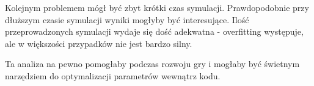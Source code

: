 \documentclass{article}
\begin{document}
Kolejnym problemem mógł być zbyt krótki czas symulacji. Prawdopodobnie przy dłuższym czasie symulacji wyniki mogłyby być interesujące. Ilość przeprowadzonych symulacji wydaje się dość adekwatna - overfitting występuje, ale w większości przypadków nie jest bardzo silny.

Ta analiza na pewno pomogłaby podczas rozwoju gry i mogłaby być świetnym narzędziem do optymalizacji parametrów wewnątrz kodu.
\newpage


\end{document}
